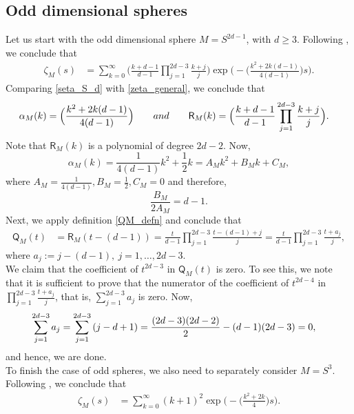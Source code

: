 \documentclass[11pt,lettersize,reqno,fullpage]{amsart}
\providecommand \hf{\hspace*{0.5cm}}
\begin{document}
\subsection{Odd dimensional spheres}
Let us start with the odd dimensional sphere $M=S^{2d-1}$, with $d \geq 3$. Following 
\cite[page 7, theorem 2.4]{Cahn}, we conclude that 
\begin{align}
\zeta_{M}(s) & = \sum_{k=0}^{\infty} \Big(\frac{k+d-1}{d-1}\prod_{j=1}^{2d-3} \frac{k+j}{j}\Big) 
\exp\Big(-\Big(\frac{k^2+2k(d-1)}{4(d-1)}\Big)s\Big). \label{seta_S_d}
\end{align}
Comparing \eqref{seta_S_d} with \eqref{zeta_general}, we conclude that 
\begin{align}
\alpha_{M}(k)& = \Big(\frac{k^2+2k(d-1)}{4(d-1)}\Big) \qquad \textnormal{and} \qquad 
\mathsf{R}_{M}(k) = 
\Big(\frac{k+d-1}{d-1}\prod_{j=1}^{2d-3} \frac{k+j}{j}\Big).
\end{align}
Note that $\mathsf{R}_{M}(k)$ is a polynomial of degree $2d-2$. Now, 
\[\alpha_{M}(k)=\frac{1}{4(d-1)}k^{2}+\frac{1}{2}k=A_{M}k^{2}+B_{M}k+C_{M}, \]
where $A_{M}=\frac{1}{4(d-1)}, B_{M}=\frac{1}{2}, C_{M}=0 $ and therefore, 
\[\frac{B_{M}}{2 A_{M}}=d-1. \]
Next, we apply definition \eqref{QM_defn} and conclude that 
\begin{align}
\mathsf{Q}_{M}(t) & = \mathsf{R}_{M}(t-(d-1))=\frac{t}{d-1} \prod_{j=1}^{2d-3} \frac{t-(d-1)+j}{j}=\frac{t}{d-1} \prod_{j=1}^{2d-3} \frac{t+a_{j}}{j} ,
\end{align}
where $a_{j}:=j-(d-1),\ j=1,\dots,2d-3 $. \\ 
\hf \hf We claim that the coefficient of $t^{2d-3} $ in $\mathsf{Q}_{M}(t)$ is zero. To see this, we note that it 
is sufficient to prove that the numerator of the coefficient of $t^{2d-4} $ in $ \prod_{j=1}^{2d-3} \frac{t+a_{j}}{j} $, that is, $\sum_{j=1}^{2d-3} a_{j} $ is zero. Now,
\begin{equation}
\begin{aligned}
\sum_{j=1}^{2d-3} a_{j}&=\sum_{j=1}^{2d-3} \left(j-d+1 \right)=\frac{(2d-3)(2d-2)}{2}-(d-1)(2d-3)=0,
\end{aligned}
\notag
\end{equation}
and hence, we are done. \\ 
\hf \hf To finish the case of odd spheres, we also need to separately consider $M=S^3$. 
Following 
\cite[page 6, equation 2.3 (a)]{Cahn}, we conclude that 
\begin{align}
\zeta_{M}(s) & = \sum_{k=0}^{\infty} (k+1)^2 \exp\Big(-\Big(\frac{k^2+2k}{4}\Big)s\Big). \label{seta_S_3}
\end{align}
\end{document}
